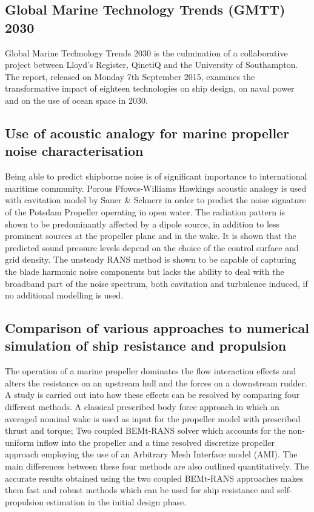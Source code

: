 \documentclass[a4paper,10pt]{article}
\begin{document}
\subsection{Global Marine Technology Trends (GMTT) 2030 \cite{Shenoi2015}}

	Global Marine Technology Trends 2030 is the culmination of a collaborative project between Lloyd’s Register, QinetiQ and the University of Southampton. The report, released on Monday 7th September 2015, examines the transformative impact of eighteen technologies on ship design, on naval power and on the use of ocean space in 2030.

\subsection{Use of acoustic analogy for marine propeller noise characterisation \cite{Lidtke2015a}}

	Being able to predict shipborne noise is of significant importance to international maritime community. Porous Ffowcs-Williams Hawkings acoustic analogy is used with cavitation model by Sauer \& Schnerr in order to predict the noise signature of the Potsdam Propeller operating in open water. The radiation pattern is shown to be predominantly affected by a dipole source, in addition to less prominent sources at the propeller plane and in the wake. It is shown that the predicted sound pressure levels depend on the choice of the control surface and grid density. The unsteady RANS method is shown to be capable of capturing the blade harmonic noise components but lacks the ability to deal with the broadband part of the noise spectrum, both cavitation and turbulence induced, if no additional modelling is used.

\subsection{Comparison of various approaches to numerical simulation of ship resistance and propulsion \cite{Badoe2014}}

	The operation of a marine propeller dominates the flow interaction effects and alters the resistance on an upstream hull and the forces on a downstream rudder. A study is carried out into how these effects can be resolved by comparing four different methods. A classical prescribed body force approach in which an averaged nominal wake is used as input for the propeller model with prescribed thrust and torque; Two coupled BEMt-RANS solver which accounts for the non-uniform inflow into the propeller and a time resolved discretize propeller approach employing the use of an Arbitrary Mesh Interface model (AMI). The main differences between these four methods are also outlined quantitatively. The accurate results obtained using the two coupled BEMt-RANS approaches makes them fast and robust methods which can be used for ship resistance and self-propulsion estimation in the initial design phase.
\end{document}
